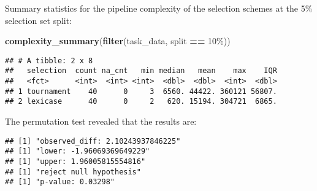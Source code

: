 \documentclass[
]{book}
\newenvironment{Shaded}{\begin{snugshade}}{\end{snugshade}}
\newcommand{\AttributeTok}[1]{\textcolor[rgb]{0.13,0.29,0.53}{#1}}
\newcommand{\DecValTok}[1]{\textcolor[rgb]{0.00,0.00,0.81}{#1}}
\newcommand{\FunctionTok}[1]{\textcolor[rgb]{0.13,0.29,0.53}{\textbf{#1}}}
\newcommand{\NormalTok}[1]{#1}
\newcommand{\OtherTok}[1]{\textcolor[rgb]{0.56,0.35,0.01}{#1}}
\newcommand{\SpecialCharTok}[1]{\textcolor[rgb]{0.81,0.36,0.00}{\textbf{#1}}}
\newcommand{\StringTok}[1]{\textcolor[rgb]{0.31,0.60,0.02}{#1}}
\begin{document}
Summary statistics for the pipeline complexity of the selection schemes at the 5\% selection set split:

\begin{Shaded}
\begin{Highlighting}[]
\FunctionTok{complexity\_summary}\NormalTok{(}\FunctionTok{filter}\NormalTok{(task\_data, split }\SpecialCharTok{==} \StringTok{\textquotesingle{}10\%\textquotesingle{}}\NormalTok{))}
\end{Highlighting}
\end{Shaded}

\begin{verbatim}
## # A tibble: 2 x 8
##   selection  count na_cnt   min median   mean    max    IQR
##   <fct>      <int>  <int> <int>  <dbl>  <dbl>  <int>  <dbl>
## 1 tournament    40      0     3  6560. 44422. 360121 56807.
## 2 lexicase      40      0     2   620. 15194. 304721  6865.
\end{verbatim}

The permutation test revealed that the results are:

\begin{Shaded}
\end{Shaded}

\begin{verbatim}
## [1] "observed_diff: 2.10243937846225"
## [1] "lower: -1.96069369649229"
## [1] "upper: 1.96005815554816"
## [1] "reject null hypothesis"
## [1] "p-value: 0.03298"
\end{verbatim}
\end{document}
